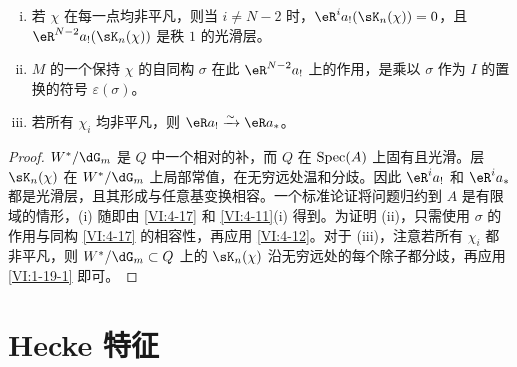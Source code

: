 \begin{proposition_}\label{VI:4-20}
\begin{enumerate}[(i)]
\item 若 $\chi$ 在每一点均非平凡，则当 $i\ne N-2$ 时，$\eR^ia_!(\sK_n(\chi))=0$，且 $\eR^{N-2}a_!(\sK_n(\chi))$ 是秩 $1$ 的光滑层。
\item $M$ 的一个保持 $\chi$ 的自同构 $\sigma$ 在此 $\eR^{N-2}a_!$ 上的作用，是乘以 $\sigma$ 作为 $I$ 的置换的符号 $\varepsilon(\sigma)$。
\item 若所有 $\chi_i$ 均非平凡，则 $\eR a_!\iso\eR a_\ast$。
\end{enumerate}
\end{proposition_}
\begin{proof}
$W^\ast/\dG_m$ 是 $Q$ 中一个相对的补，而 $Q$ 在 $\operatorname{Spec}(A)$ 上固有且光滑。层 $\sK_n(\chi)$ 在 $W^\ast/\dG_m$ 上局部常值，在无穷远处温和分歧。因此 $\eR^ia_!$ 和 $\eR^ia_\ast$ 都是光滑层，且其形成与任意基变换相容。一个标准论证将问题归约到 $A$ 是有限域的情形，(i) 随即由 \ref{VI:4-17} 和 \ref{VI:4-11}(i) 得到。为证明 (ii)，只需使用 $\sigma$ 的作用与同构 \ref{VI:4-17} 的相容性，再应用 \ref{VI:4-12}。对于 (iii)，注意若所有 $\chi_i$ 都非平凡，则 $W^\ast/\dG_m\subset Q$ 上的 $\sK_n(\chi)$ 沿无穷远处的每个除子都分歧，再应用 \ref{VI:1-19-1} 即可。
\end{proof}

\section{Hecke 特征}\label{VI:5}

